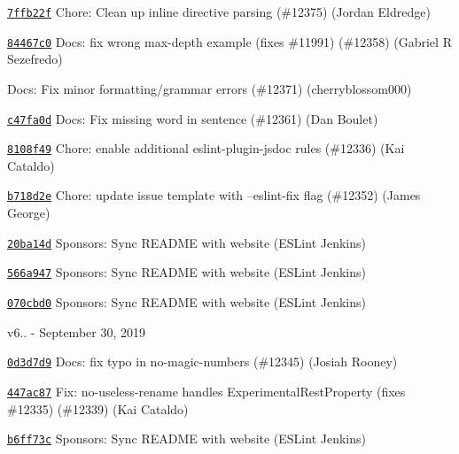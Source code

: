 \begin{DoxyItemize}
\item \href{https://github.com/eslint/eslint/commit/7ffb22f61cf1622511a7fe42b5ead7c3b216df5e}{\texttt{ {\ttfamily 7ffb22f}}} Chore\+: Clean up inline directive parsing (\#12375) (Jordan Eldredge)
\item \href{https://github.com/eslint/eslint/commit/84467c07461cc47ee43807ba9014e13700473c5c}{\texttt{ {\ttfamily 84467c0}}} Docs\+: fix wrong max-\/depth example (fixes \#11991) (\#12358) (Gabriel R Sezefredo)
\item \href{https://github.com/eslint/eslint/commit/364234262efabd91fa8bd53161d9d3e1e37e7944}{\texttt{ {}}} Docs\+: Fix minor formatting/grammar errors (\#12371) (cherryblossom000)
\item \href{https://github.com/eslint/eslint/commit/c47fa0dfc76211b3b0e5649c63acdd9606ce0eca}{\texttt{ {\ttfamily c47fa0d}}} Docs\+: Fix missing word in sentence (\#12361) (Dan Boulet)
\item \href{https://github.com/eslint/eslint/commit/8108f49f9fa0c2de80b3b66c847551beff585951}{\texttt{ {\ttfamily 8108f49}}} Chore\+: enable additional eslint-\/plugin-\/jsdoc rules (\#12336) (Kai Cataldo)
\item \href{https://github.com/eslint/eslint/commit/b718d2e6c9fe3fc56aa7cfc68b1a40b5cd8a7c01}{\texttt{ {\ttfamily b718d2e}}} Chore\+: update issue template with --eslint-\/fix flag (\#12352) (James George)
\item \href{https://github.com/eslint/eslint/commit/20ba14dc78fc2654b2920d14877dde21c6c10da4}{\texttt{ {\ttfamily 20ba14d}}} Sponsors\+: Sync README with website (ESLint Jenkins)
\item \href{https://github.com/eslint/eslint/commit/566a947f67c8038a50e204d68723519778a78a0f}{\texttt{ {\ttfamily 566a947}}} Sponsors\+: Sync README with website (ESLint Jenkins)
\item \href{https://github.com/eslint/eslint/commit/070cbd0a2ec07831962a25c4276d08e097302416}{\texttt{ {\ttfamily 070cbd0}}} Sponsors\+: Sync README with website (ESLint Jenkins)
\end{DoxyItemize}

v6.. -\/ September 30, 2019


\begin{DoxyItemize}
\item \href{https://github.com/eslint/eslint/commit/0d3d7d9cdd83a7f0e035c95f716a91b9ecc4868b}{\texttt{ {\ttfamily 0d3d7d9}}} Docs\+: fix typo in no-\/magic-\/numbers (\#12345) (Josiah Rooney)
\item \href{https://github.com/eslint/eslint/commit/447ac877e8ca2858d61b1e983f72d39e3e2ca74d}{\texttt{ {\ttfamily 447ac87}}} Fix\+: no-\/useless-\/rename handles Experimental\+Rest\+Property (fixes \#12335) (\#12339) (Kai Cataldo)
\item \href{https://github.com/eslint/eslint/commit/b6ff73cad13282fbfc91186cf4bc2f20278a8936}{\texttt{ {\ttfamily b6ff73c}}} Sponsors\+: Sync README with website (ESLint Jenkins)
\end{DoxyItemize}

